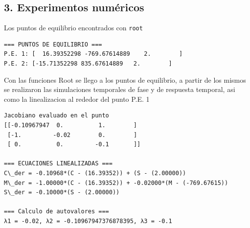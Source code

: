 \documentclass[11pt]{article}
\begin{document}
    \subsection{3. Experimentos numéricos}\label{experimentos-numuxe9ricos}

Los puntos de equilibrio encontrados con \texttt{root}

    \begin{Verbatim}[commandchars=\\\{\}]
=== PUNTOS DE EQUILIBRIO ===
P.E. 1: [  16.39352298 -769.67614889    2.        ]
P.E. 2: [-15.71352298 835.67614889   2.        ]
    \end{Verbatim}

    Con las funciones Root se llego a los puntos de equilibrio, a partir de
los mismos se realizaron las simulaciones temporales de fase y de
respuesta temporal, asi como la linealizacion al rededor del punto P.E.
1

    \begin{Verbatim}[commandchars=\\\{\}]
Jacobiano evaluado en el punto
[[-0.10967947  0.          1.        ]
 [-1.         -0.02        0.        ]
 [ 0.          0.         -0.1       ]]

=== ECUACIONES LINEALIZADAS ===
C\_der = -0.10968*(C - (16.39352)) + (S - (2.00000))
M\_der = -1.00000*(C - (16.39352)) + -0.02000*(M - (-769.67615))
S\_der = -0.10000*(S - (2.00000))

=== Calculo de autovalores ===
λ1 = -0.02, λ2 = -0.10967947376878395, λ3 = -0.1
    \end{Verbatim}

    \begin{center}
    \end{center}
    { \hspace*{\fill} \\}
    
    \begin{center}
    \end{center}
    { \hspace*{\fill} \\}
    
    \begin{center}
    \end{center}
    { \hspace*{\fill} \\}
    
\end{document}
